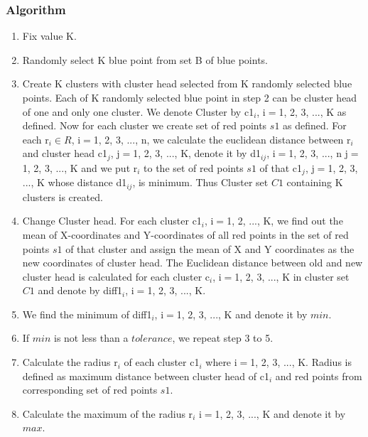 \documentclass[12pt,a4wide]{report}
\theoremstyle{plain}
\theoremstyle{definition}
\theoremstyle{remark}
\begin{document}
\subsubsection{Algorithm}
\begin{enumerate}
 \item Fix value K.
 
 \item Randomly select K blue point from set B of blue points.
 
 \item Create K clusters with cluster head selected from K randomly selected blue points. Each of K randomly selected blue point 
  in step 2 can be cluster head of one and only one cluster. We denote Cluster by c1$_{i}$, i$=$1, 2, 3, ..., K as defined. Now for each 
  cluster we create set of red points $s1$ as defined. For each r$_{i} \in R$, i$=$1, 2, 3, ..., n, we calculate the euclidean 
  distance between r$_{i}$ and cluster head c1$_{j}$, j$=$1, 2, 3, ..., K, denote it by d1$_{ij}$, i$=$1, 2, 3, ..., n  j$=$1, 2, 3, ..., K 
  and we put r$_{i}$ to the set of red points $s1$ of that c1$_{j}$, j$=$1, 2, 3, ..., K whose distance d1$_{ij}$, is minimum.
  Thus Cluster set $C1$ containing K clusters is created.
  
  \item Change Cluster head. For each cluster c1$_{i}$, i$=$1, 2, ..., K, we find out the mean of X-coordinates and Y-coordinates of all
  red points in the set of red points $s1$ of that cluster and assign the mean of X and Y coordinates as the new coordinates 
  of cluster head. The Euclidean distance between old and new cluster head is calculated for each cluster c$_{i}$, i$=$1, 2, 3, ..., K 
  in cluster set $C1$ and denote by diff1$_{i}$, i$=$1, 2, 3, ..., K.
  
 \item We find the minimum of diff1$_{i}$, i$=$1, 2, 3, ..., K and denote it by $min$.
 
 \item If $min$ is not less than a $tolerance$, we repeat step 3 to 5.
 
 \item Calculate the radius r$_{i}$ of each cluster c1$_{i}$ where i$=$1, 2, 3, ..., K. Radius is defined as maximum distance 
  between cluster head of c1$_{i}$ and red points from corresponding set of red points $s1$.
  
 \item Calculate the maximum of the radius r$_{i}$ i$=$1, 2, 3, ..., K and denote it by $max$.
 

\end{enumerate}
\end{document}
